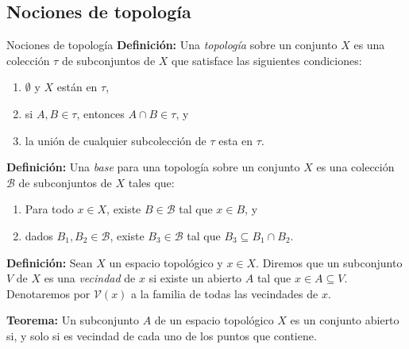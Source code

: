 \documentclass[9pt]{beamer}
\begin{document}
\subsection{Nociones de topología}
\begin{frame}{Nociones de topología}
\textbf{Definición:} Una \textit{topología} sobre un conjunto $X$ es una colección $\tau$ de subconjuntos de $X$ que satisface las siguientes condiciones:
\begin{enumerate}
    \item $\emptyset$ y $X$ están en $\tau$,
    \item si $A,B\in\tau$, entonces $A\cap B\in\tau$, y 
    \item la unión de cualquier subcolección de $\tau$ esta en $\tau$.
\end{enumerate}

\textbf{Definición:} Una \textit{base} para una topología sobre un conjunto $X$ es una colección $\mathcal{B}$ de subconjuntos de $X$ tales que:
\begin{enumerate}
    \item Para todo $x\in X$, existe $B\in\mathcal{B}$ tal que $x\in B$, y
    \item dados $B_1,B_2\in\mathcal{B}$, existe $B_3\in\mathcal{B}$ tal que $B_3\subseteq B_1\cap B_2$.
\end{enumerate}

\textbf{Definición:} Sean $X$ un espacio topológico y $x\in X$. Diremos que un subconjunto $V$ de $X$ es una \textit{vecindad} de $x$ si existe un abierto $A$ tal que $x\in A\subseteq V$. Denotaremos por $\mathcal{V}(x)$ a la familia de todas las vecindades de $x$.

\textbf{Teorema:} Un subconjunto $A$ de un espacio topológico $X$ es un conjunto abierto si, y solo si es vecindad de cada uno de los puntos que contiene.
\end{frame}
\end{document}
